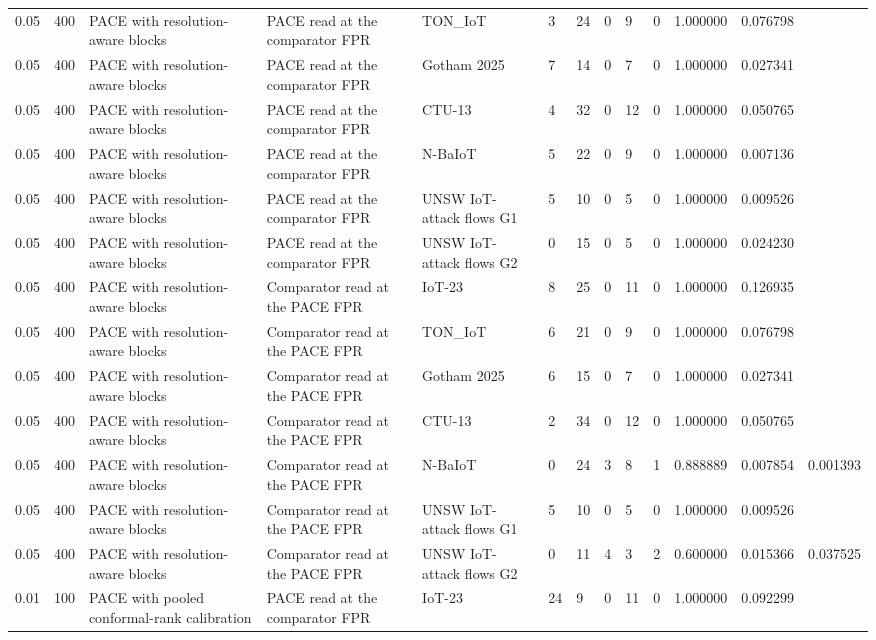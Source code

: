 \begin{tabular}{lllllllllllll}
0.05 & 400 & PACE with resolution-aware blocks & PACE read at the comparator FPR & TON\_IoT & 3 & 24 & 0 & 9 & 0 & 1.000000 & 0.076798 &  \\
0.05 & 400 & PACE with resolution-aware blocks & PACE read at the comparator FPR & Gotham 2025 & 7 & 14 & 0 & 7 & 0 & 1.000000 & 0.027341 &  \\
0.05 & 400 & PACE with resolution-aware blocks & PACE read at the comparator FPR & CTU-13 & 4 & 32 & 0 & 12 & 0 & 1.000000 & 0.050765 &  \\
0.05 & 400 & PACE with resolution-aware blocks & PACE read at the comparator FPR & N-BaIoT & 5 & 22 & 0 & 9 & 0 & 1.000000 & 0.007136 &  \\
0.05 & 400 & PACE with resolution-aware blocks & PACE read at the comparator FPR & UNSW IoT-attack flows G1 & 5 & 10 & 0 & 5 & 0 & 1.000000 & 0.009526 &  \\
0.05 & 400 & PACE with resolution-aware blocks & PACE read at the comparator FPR & UNSW IoT-attack flows G2 & 0 & 15 & 0 & 5 & 0 & 1.000000 & 0.024230 &  \\
0.05 & 400 & PACE with resolution-aware blocks & Comparator read at the PACE FPR & IoT-23 & 8 & 25 & 0 & 11 & 0 & 1.000000 & 0.126935 &  \\
0.05 & 400 & PACE with resolution-aware blocks & Comparator read at the PACE FPR & TON\_IoT & 6 & 21 & 0 & 9 & 0 & 1.000000 & 0.076798 &  \\
0.05 & 400 & PACE with resolution-aware blocks & Comparator read at the PACE FPR & Gotham 2025 & 6 & 15 & 0 & 7 & 0 & 1.000000 & 0.027341 &  \\
0.05 & 400 & PACE with resolution-aware blocks & Comparator read at the PACE FPR & CTU-13 & 2 & 34 & 0 & 12 & 0 & 1.000000 & 0.050765 &  \\
0.05 & 400 & PACE with resolution-aware blocks & Comparator read at the PACE FPR & N-BaIoT & 0 & 24 & 3 & 8 & 1 & 0.888889 & 0.007854 & 0.001393 \\
0.05 & 400 & PACE with resolution-aware blocks & Comparator read at the PACE FPR & UNSW IoT-attack flows G1 & 5 & 10 & 0 & 5 & 0 & 1.000000 & 0.009526 &  \\
0.05 & 400 & PACE with resolution-aware blocks & Comparator read at the PACE FPR & UNSW IoT-attack flows G2 & 0 & 11 & 4 & 3 & 2 & 0.600000 & 0.015366 & 0.037525 \\
0.01 & 100 & PACE with pooled conformal-rank calibration & PACE read at the comparator FPR & IoT-23 & 24 & 9 & 0 & 11 & 0 & 1.000000 & 0.092299 &  \\

\end{tabular}
